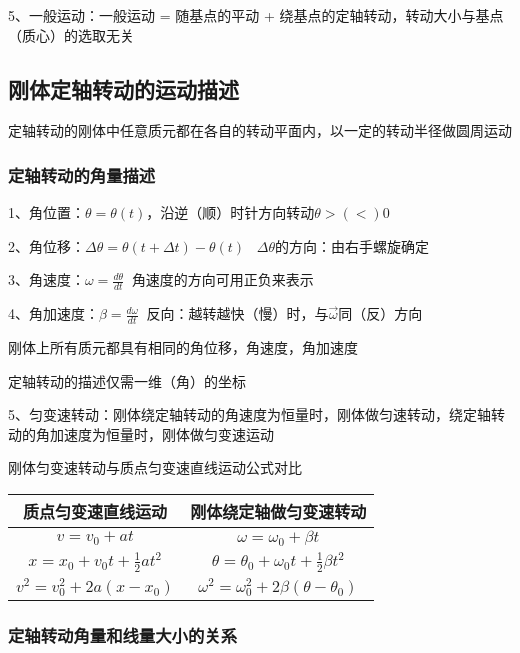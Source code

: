 \documentclass[UTF8]{article}
\begin{document}
    5、一般运动：一般运动 = 随基点的平动 + 绕基点的定轴转动，转动大小与基点（质心）的选取无关

\subsection{刚体定轴转动的运动描述}

    定轴转动的刚体中任意质元都在各自的转动平面内，以一定的转动半径做圆周运动

\subsubsection{定轴转动的角量描述}

    1、角位置：$\theta = \theta (t)$，沿逆（顺）时针方向转动\;\;\;$\theta >(<) 0$

    2、角位移：$\Delta\theta = \theta(t + \Delta t) - \theta(t)\;\;\;\Delta\theta$的方向：由右手螺旋确定

    3、角速度：$\omega = \frac{d\theta}{dt}\;\;$角速度的方向可用正负来表示

    4、角加速度：$\beta = \frac{d\omega}{dt}\;\;$反向：越转越快（慢）时，与$\vec{\omega}$同（反）方向

    刚体上所有质元都具有相同的角位移，角速度，角加速度

    定轴转动的描述仅需一维（角）的坐标

    5、匀变速转动：刚体绕定轴转动的角速度为恒量时，刚体做匀速转动，绕定轴转动的角加速度为恒量时，刚体做匀变速运动

    刚体匀变速转动与质点匀变速直线运动公式对比

    \begin{tabular}{|c|c|}%
        \hline  %
        质点匀变速直线运动&刚体绕定轴做匀变速转动\\
        \hline  %
        $v = v_0 + at$&$\omega = \omega_0 + \beta t$\\
        \hline %
        $x = x_0 + v_0t + \frac{1}{2}at^2$&$\theta = \theta_0 + \omega_0t + \frac{1}{2}\beta t^2$\\
        \hline %
        $v^2 = v_0^2 + 2a(x - x_0)$&$\omega^2 = \omega_0^2 + 2\beta(\theta - \theta_0)$\\
        \hline %
    \end{tabular}

\subsubsection{定轴转动角量和线量大小的关系}
\end{document}
